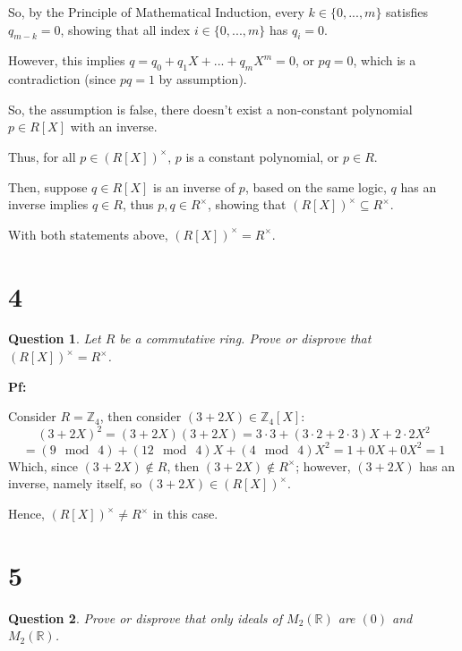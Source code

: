 \documentclass{article}
\newtheorem{question}{Question}
\begin{document}
\hfill

So, by the Principle of Mathematical Induction, every $k\in \{0,...,m\}$ satisfies $q_{m-k}=0$, showing that all index $i\in\{0,...,m\}$ has $q_i=0$.

However, this implies $q = q_0+q_1X+...+q_mX^m = 0$, or $pq = 0$, which is a contradiction (since $pq=1$ by assumption).

So, the assumption is false, there doesn't exist a non-constant polynomial $p\in R[X]$ with an inverse.

Thus, for all $p\in (R[X])^\times$, $p$ is a constant polynomial, or $p\in R$.

Then, suppose $q\in R[X]$ is an inverse of $p$, based on the same logic, $q$ has an inverse implies $q\in R$, thus $p,q\in R^\times$, showing that $(R[X])^\times \subseteq R^\times$.

\hfill

With both statements above, $(R[X])^\times = R^\times$.


\hfill

\hfill


\section*{4}
\begin{myBox}[]{}
    \begin{question}
        Let $R$ be a commutative ring. Prove or disprove that $(R[X])^\times = R^\times$.
    \end{question}
\end{myBox}

\textbf{Pf:}

Consider $R=\mathbb{Z}_4$, then consider $(3+2X)\in \mathbb{Z}_4[X]$:
$$(3+2X)^2 = (3+2X)(3+2X) = 3\cdot 3 + (3\cdot 2+2\cdot 3)X + 2\cdot 2X^2$$
$$ = (9\mod\ 4)+(12\mod\ 4)X + (4\mod\ 4)X^2 = 1+0X+0X^2 = 1$$
Which, since $(3+2X)\notin R$, then $(3+2X)\notin R^\times$; however, $(3+2X)$ has an inverse, namely itself,
so $(3+2X)\in (R[X])^\times$.

Hence, $(R[X])^\times \neq R^\times$ in this case.

\break


\section*{5}
\begin{myBox}[]{}
    \begin{question}
        Prove or disprove that only ideals of $M_2(\mathbb{R})$ are $(0)$ and $M_2(\mathbb{R})$.
    \end{question}
\end{myBox}
\end{document}
